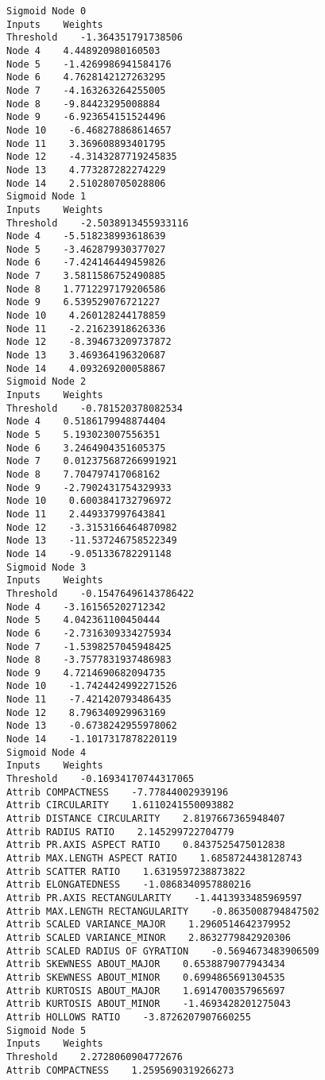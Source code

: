 \documentclass[
	article,			%
	11pt,				%
	oneside,			%
	a4paper,			%
	english,			%
	brazil,				%
	sumario=tradicional
	]{abntex2}
\begin{document}
\begin{lstlisting}
Sigmoid Node 0
Inputs    Weights
Threshold    -1.364351791738506
Node 4    4.448920980160503
Node 5    -1.4269986941584176
Node 6    4.7628142127263295
Node 7    -4.163263264255005
Node 8    -9.84423295008884
Node 9    -6.923654151524496
Node 10    -6.468278868614657
Node 11    3.369608893401795
Node 12    -4.3143287719245835
Node 13    4.773287282274229
Node 14    2.510280705028806
Sigmoid Node 1
Inputs    Weights
Threshold    -2.5038913455933116
Node 4    -5.518238993618639
Node 5    -3.462879930377027
Node 6    -7.424146449459826
Node 7    3.5811586752490885
Node 8    1.7712297179206586
Node 9    6.539529076721227
Node 10    4.260128244178859
Node 11    -2.21623918626336
Node 12    -8.394673209737872
Node 13    3.469364196320687
Node 14    4.093269200058867
Sigmoid Node 2
Inputs    Weights
Threshold    -0.781520378082534
Node 4    0.5186179948874404
Node 5    5.193023007556351
Node 6    3.2464904351605375
Node 7    0.012375687266991921
Node 8    7.704797417068162
Node 9    -2.7902431754329933
Node 10    0.6003841732796972
Node 11    2.449337997643841
Node 12    -3.3153166464870982
Node 13    -11.537246758522349
Node 14    -9.051336782291148
Sigmoid Node 3
Inputs    Weights
Threshold    -0.15476496143786422
Node 4    -3.161565202712342
Node 5    4.042361100450444
Node 6    -2.7316309334275934
Node 7    -1.5398257045948425
Node 8    -3.7577831937486983
Node 9    4.7214690682094735
Node 10    -1.7424424992271526
Node 11    -7.421420793486435
Node 12    8.796340929963169
Node 13    -0.6738242955978062
Node 14    -1.1017317878220119
Sigmoid Node 4
Inputs    Weights
Threshold    -0.16934170744317065
Attrib COMPACTNESS    -7.77844002939196
Attrib CIRCULARITY    1.6110241550093882
Attrib DISTANCE CIRCULARITY    2.8197667365948407
Attrib RADIUS RATIO    2.145299722704779
Attrib PR.AXIS ASPECT RATIO    0.8437525475012838
Attrib MAX.LENGTH ASPECT RATIO    1.6858724438128743
Attrib SCATTER RATIO    1.6319597238873822
Attrib ELONGATEDNESS    -1.0868340957880216
Attrib PR.AXIS RECTANGULARITY    -1.4413933485969597
Attrib MAX.LENGTH RECTANGULARITY    -0.8635008794847502
Attrib SCALED VARIANCE_MAJOR    1.2960514642379952
Attrib SCALED VARIANCE_MINOR    2.8632779842920306
Attrib SCALED RADIUS OF GYRATION    -0.5694673483906509
Attrib SKEWNESS ABOUT_MAJOR    0.6538879077943434
Attrib SKEWNESS ABOUT_MINOR    0.6994865691304535
Attrib KURTOSIS ABOUT_MAJOR    1.6914700357965697
Attrib KURTOSIS ABOUT_MINOR    -1.4693428201275043
Attrib HOLLOWS RATIO    -3.8726207907660255
Sigmoid Node 5
Inputs    Weights
Threshold    2.2728060904772676
Attrib COMPACTNESS    1.2595690319266273

\end{lstlisting}
\end{document}

